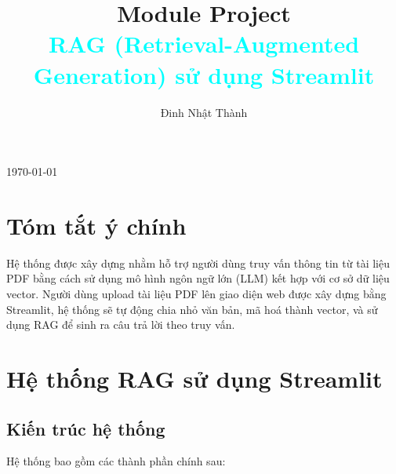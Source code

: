 \documentclass[11pt]{article}
\title{{Module Project}\\[0.5em]\textcolor{cyan}{RAG (Retrieval-Augmented Generation) sử dụng Streamlit}}
\author{Đinh Nhật Thành}
\date{}
\renewcommand{\maketitle}{} %
\begin{document}
\maketitle

\begin{titlepage}
    \centering
    \vspace*{\fill}

    {\Huge \textbf{\thetitle} \par}
    \vspace{2em}

    {\Large \textbf{\theauthor} \par}
    \vspace{1em}

    {\large \today \par}

    \vspace*{\fill}
    \thispagestyle{fancy}
\end{titlepage}

\newpage
\tableofcontents
\thispagestyle{fancy}


\newpage

\renewcommand{\thesubsection}{\arabic{subsection}}
\newpage


\section{Tóm tắt ý chính}

Hệ thống được xây dựng nhằm hỗ trợ người dùng truy vấn thông tin từ tài liệu PDF bằng cách sử dụng mô hình ngôn ngữ lớn (LLM) kết hợp với cơ sở dữ liệu vector. Người dùng upload tài liệu PDF lên giao diện web được xây dựng bằng Streamlit, hệ thống sẽ tự động chia nhỏ văn bản, mã hoá thành vector, và sử dụng RAG để sinh ra câu trả lời theo truy vấn.

\section{Hệ thống RAG sử dụng Streamlit}

\subsection*{Kiến trúc hệ thống}

Hệ thống bao gồm các thành phần chính sau:
\end{document}
